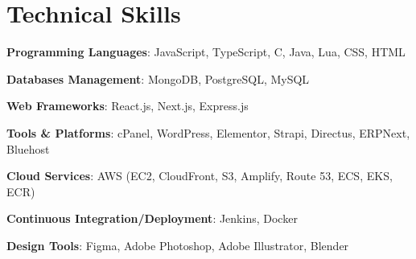 \section{Technical Skills}
\begin{itemize}[leftmargin=0.15in, label={}, itemsep=-0.04in]
	\small{
	\item \textbf{Programming Languages}: JavaScript, TypeScript, C, Java, Lua, CSS, HTML
	\item \textbf{Databases Management}: MongoDB, PostgreSQL, MySQL
	\item \textbf{Web Frameworks}: React.js, Next.js, Express.js
	\item \textbf{Tools \& Platforms}:  cPanel, WordPress, Elementor, Strapi, Directus, ERPNext, Bluehost
	\item \textbf{Cloud Services}: AWS (EC2, CloudFront, S3, Amplify, Route 53, ECS, EKS, ECR)
	\item \textbf{Continuous Integration/Deployment}: Jenkins, Docker
    \item \textbf{Design Tools}: Figma, Adobe Photoshop, Adobe Illustrator, Blender
	      }
\end{itemize}
